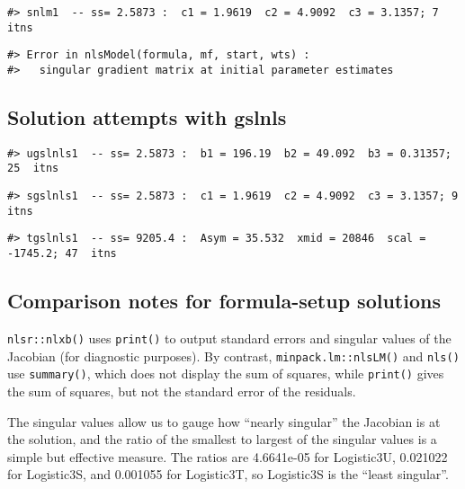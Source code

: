 \begin{verbatim}
#> snlm1  -- ss= 2.5873 :  c1 = 1.9619  c2 = 4.9092  c3 = 3.1357; 7  itns
\end{verbatim}

\begin{verbatim}
#> Error in nlsModel(formula, mf, start, wts) : 
#>   singular gradient matrix at initial parameter estimates
\end{verbatim}

\hypertarget{solution-attempts-with-gslnls}{%
\subsection{Solution attempts with gslnls}\label{solution-attempts-with-gslnls}}

\begin{verbatim}
#> ugslnls1  -- ss= 2.5873 :  b1 = 196.19  b2 = 49.092  b3 = 0.31357; 25  itns
\end{verbatim}

\begin{verbatim}
#> sgslnls1  -- ss= 2.5873 :  c1 = 1.9619  c2 = 4.9092  c3 = 3.1357; 9  itns
\end{verbatim}

\begin{verbatim}
#> tgslnls1  -- ss= 9205.4 :  Asym = 35.532  xmid = 20846  scal = -1745.2; 47  itns
\end{verbatim}

\hypertarget{comparison-notes-for-formula-setup-solutions}{%
\subsection{Comparison notes for formula-setup solutions}\label{comparison-notes-for-formula-setup-solutions}}

\texttt{nlsr::nlxb()} uses \texttt{print()} to output standard errors and
singular values of the Jacobian (for diagnostic purposes). By contrast,
\texttt{minpack.lm::nlsLM()} and \texttt{nls()}
use \texttt{summary()}, which does not display the sum of squares, while \texttt{print()}
gives the sum of squares, but not the standard error of the residuals.

The singular values allow us to gauge how ``nearly singular'' the
Jacobian is at the solution, and the ratio of the smallest to largest of the
singular values is a simple but effective measure. The ratios are
4.6641e-05 for Logistic3U, 0.021022 for Logistic3S, and 0.001055 for
Logistic3T, so Logistic3S is the ``least singular''.

